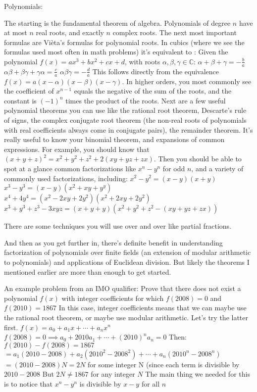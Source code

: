 
Polynomials:

The starting is the fundamental theorem of algebra. Polynomials of degree $n$ have at most $n$ real roots, and exactly $n$ complex roots.
The next most important formulas are Vièta’s formulas for polynomial roots. In cubics (where we see the formulas used most often in math problems) it’s equivalent to :
Given the polynomial $f(x) = ax^3 + bx^2 + cx + d$, with roots $\alpha, \beta, \gamma \in \mathbb{C}$:
$\displaystyle \alpha + \beta + \gamma = -\frac{b}{a}$
$\displaystyle \alpha\beta + \beta\gamma + \gamma\alpha = \frac{c}{a}$
$\displaystyle \alpha \beta \gamma = -\frac{d}{a}$
This follows directly from the equivalence $f(x) = a(x-\alpha)(x-\beta)(x-\gamma)$. In higher orders, you most commonly see the coefficient of $x^{n-1}$ equals the negative of the sum of the roots, and the constant is $(-1)^n$ times the product of the roots.
Next are a few useful polynomial theorems you can use like the rational root theorem, Descarte’s rule of signs, the complex conjugate root theorem (the non-real roots of polynomials with real coefficients always come in conjugate pairs), the remainder theorem.
It’s really useful to know your binomial theorem, and expansions of common expressions. For example, you should know that $(x+y+z)^2 = x^2+y^2+z^2+2(xy+yz+zx)$. Then you should be able to spot at a glance common factorizations like $x^n-y^n$ for odd $n$, and a variety of commonly used factorizations, including:
$x^2-y^2 = (x-y)(x+y)$
$x^3-y^3 = (x-y)(x^2+xy+y^y)$
$x^4+4y^4 = (x^2-2xy+2y^2)(x^2+2xy+2y^2)$
$x^3+y^3+z^3-3xyz = (x+y+y)(x^2+y^2+z^2-(xy+yz+zx))$

There are some techniques you will use over and over like partial fractions.

And then as you get further in, there’s definite benefit in understanding factorization of polynomials over finite fields (an extension of modular arithmetic to polynomials) and applications of Euclidean division. But likely the theorems I mentioned earlier are more than enough to get started.


An example problem from an IMO qualifier:
Prove that there does not exist a polynomial $f(x)$ with integer coeﬃcients for which $f(2008) = 0$ and $f(2010) = 1867$
In this case, integer coefficients means that we can maybe use the rational root theorem, or maybe use modular arithmetic. Let’s try the latter first.
$f(x) = a_0 + a_1x + \cdots + a_nx^n$
$f(2008) = 0 \implies a_0 + 2010a_1 + \cdots + (2010)^n a_n = 0$
Then: 
$f(2010) - f(2008) = 1867$
$= a_1(2010 -2008) + a_2(2010^2-2008^2) + \cdots + a_n(2010^n-2008^n)$
$= (2010-2008) N = 2N$
for some integer N (since each term is divisible by $2010-2008$
But $2N \neq 1867$ for any integer $N$
The main thing we needed for this is to notice that $x^n-y^n$ is divisible by $x-y$ for all $n$

